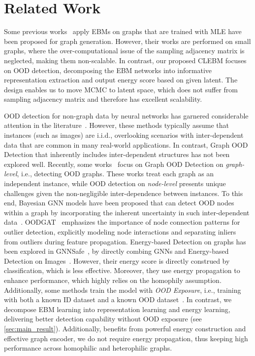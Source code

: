 \vspace{-3mm}
\section{Related Work}
\vspace{-3mm}

 Some previous works~\citep{hataya2021graph,liu2021graphebm} apply EBMs on graphs that are trained with MLE have been proposed for graph generation. However, their works are performed on small graphs, where the over-computational issue of the sampling adjacency matrix is neglected, making them non-scalable. In contrast, our proposed CLEBM focuses on OOD detection, decomposing the EBM networks into informative representation extraction and output energy score based on given latent. The design enables us to move MCMC to latent space, which does not suffer from sampling adjacency matrix and therefore has excellent scalability.

OOD detection for non-graph data by neural networks has garnered considerable attention in the literature~\citep{hendrycks2016baseline,maxlogits-2019,ood-dis-2018,liu2020energy,mohseni2020self,ren2019likelihood}. However, these methods typically assume that instances (such as images) are i.i.d., overlooking scenarios with inter-dependent data that are common in many real-world applications. In contrast, Graph OOD Detection that inherently includes inter-dependent structures has not been explored well. 
Recently, some works~\citep{ligraphde,bazhenov2022towards} focus on Graph OOD Detection on \textit{graph-level}, i.e., detecting OOD graphs. 
These works treat each graph as an independent instance, while OOD detection on \textit{node-level} presents unique challenges given the non-negligible inter-dependence between instances. 
To this end, Bayesian GNN models have been proposed that can detect OOD nodes within a graph by incorporating the inherent uncertainty in such inter-dependent data~\citep{GKDE-2020, GPN-2021}.  
OODGAT~\citep{song2022learning} emphasizes the importance of node connection patterns for outlier detection, explicitly modeling node interactions and separating inliers from outliers during feature propagation.
Energy-based Detection on graphs has been explored in GNNSafe~\citep{wu2023gnnsafe}, by directly combing GNNs and Energy-based Detection on Images~\citep{liu2020energy}. 
However, their energy score is directly construed by classification, which is less effective. Moreover, they use energy propagation to enhance performance, which highly relies on the homophily assumption. 
Additionally, some methods train the model with \textit{OOD Exposure}, i.e., training with both a known ID dataset and a known OOD dataset~\citep{hendrycks2018deep,liu2020energy,wu2023gnnsafe}. In contrast, we decompose EBM learning into representation learning and energy learning, delivering better detection capability without OOD exposure (see \cref{sec:main_result}). Additionally, benefits from powerful energy construction and effective graph encoder, we do not require energy propagation, thus keeping high performance across homophilic and heterophilic graphs.

